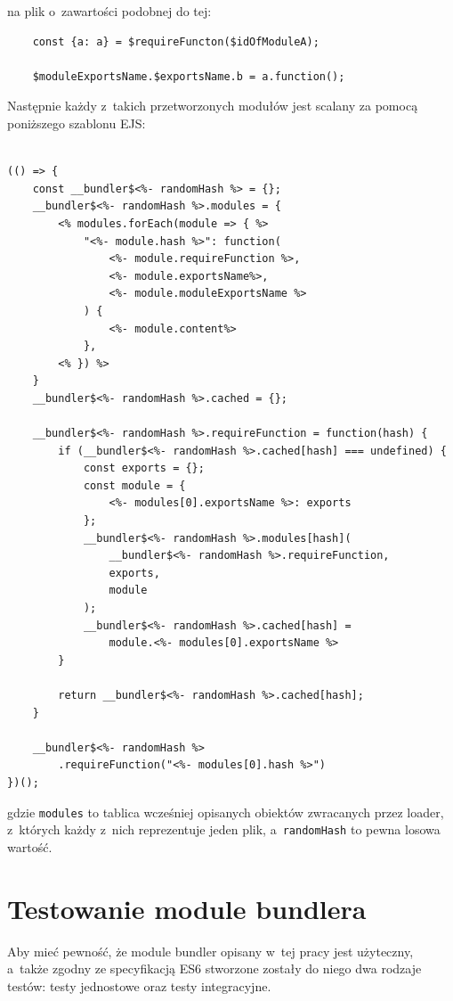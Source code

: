 \documentclass{SGGW-thesis}
\begin{document}
na plik o~zawartości podobnej do tej:
\begin{verbatim}
    const {a: a} = $requireFuncton($idOfModuleA);

    $moduleExportsName.$exportsName.b = a.function();
\end{verbatim}

Następnie każdy z~takich przetworzonych modułów jest scalany za pomocą poniższego szablonu EJS:
\begin{verbatim}
    
(() => {
    const __bundler$<%- randomHash %> = {};
    __bundler$<%- randomHash %>.modules = {
        <% modules.forEach(module => { %>
            "<%- module.hash %>": function(
                <%- module.requireFunction %>,
                <%- module.exportsName%>,
                <%- module.moduleExportsName %>
            ) {
                <%- module.content%>
            },
        <% }) %>
    }
    __bundler$<%- randomHash %>.cached = {};

    __bundler$<%- randomHash %>.requireFunction = function(hash) {
        if (__bundler$<%- randomHash %>.cached[hash] === undefined) {
            const exports = {};
            const module = {
                <%- modules[0].exportsName %>: exports
            };
            __bundler$<%- randomHash %>.modules[hash](
                __bundler$<%- randomHash %>.requireFunction,
                exports,
                module
            );
            __bundler$<%- randomHash %>.cached[hash] =
                module.<%- modules[0].exportsName %>
        }

        return __bundler$<%- randomHash %>.cached[hash];
    }

    __bundler$<%- randomHash %>
        .requireFunction("<%- modules[0].hash %>")
})();
\end{verbatim}

gdzie \verb|modules| to tablica wcześniej opisanych obiektów zwracanych przez loader, z~których każdy z~nich reprezentuje jeden plik, a~\verb|randomHash| to pewna losowa wartość.


\section{Testowanie module bundlera}
Aby mieć pewność, że module bundler opisany w~tej pracy jest użyteczny, a~także zgodny ze specyfikacją ES6 stworzone zostały do niego dwa rodzaje testów: testy jednostowe oraz testy integracyjne.
\end{document}
